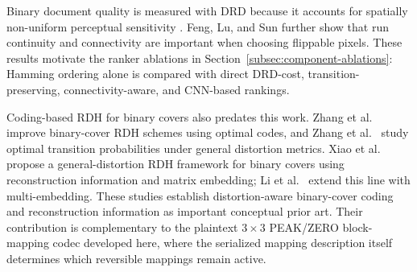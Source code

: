 \documentclass[a4paper,fleqn]{cas-dc}
\newcommand{\RevisionAddBegin}{\begingroup}
\newcommand{\RevisionAddEnd}{\endgroup}
\newcommand{\RevisionAddBegin}{\begingroup\color{revisionblue}}
\newcommand{\RevisionAddEnd}{\endgroup}
\begin{document}
\RevisionAddBegin
Binary document quality is measured with DRD because it accounts for spatially
non-uniform perceptual sensitivity \cite{Lu2004DRD}. Feng, Lu, and Sun
\cite{Feng2015Secure} further show that run continuity and connectivity are
important when choosing flippable pixels. These results motivate the ranker
ablations in Section~\ref{subsec:component-ablations}: Hamming ordering alone
is compared with direct DRD-cost, transition-preserving, connectivity-aware,
and CNN-based rankings.
\RevisionAddEnd

\RevisionAddBegin
Coding-based RDH for binary covers also predates this work. Zhang et al.\
\cite{Zhang2012OptimalCodes} improve binary-cover RDH schemes using optimal
codes, and Zhang et al.\ \cite{Zhang2015OptimalTransition} study optimal
transition probabilities under general distortion metrics. Xiao et al.\
\cite{Xiao2022BinaryCovers} propose a general-distortion RDH framework for
binary covers using reconstruction information and matrix embedding; Li et
al.\ \cite{Li2023MultiEmbedding} extend this line with multi-embedding.
These studies establish distortion-aware binary-cover coding and
reconstruction information as important conceptual prior art. Their
contribution is complementary to the plaintext $3\times3$ PEAK/ZERO
block-mapping codec developed here, where the serialized mapping description
itself determines which reversible mappings remain active.
\RevisionAddEnd
\end{document}
